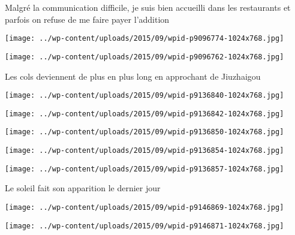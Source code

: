  \newline
 Malgré la communication difficile, je suis bien accueilli dans les restaurants et parfois on refuse de me faire payer l'addition \newline
 \newline
\centerline{\texttt{[image: ../wp-content/uploads/2015/09/wpid-p9096774-1024x768.jpg]} } 
 \newline
 \newline
\centerline{\texttt{[image: ../wp-content/uploads/2015/09/wpid-p9096762-1024x768.jpg]} } 
 \newline
 Les cols deviennent de plus en plus long en approchant de Jiuzhaigou \newline
 \newline
\centerline{\texttt{[image: ../wp-content/uploads/2015/09/wpid-p9136840-1024x768.jpg]} } 
 \newline
 \newline
\centerline{\texttt{[image: ../wp-content/uploads/2015/09/wpid-p9136842-1024x768.jpg]} } 
 \newline
 \newline
\centerline{\texttt{[image: ../wp-content/uploads/2015/09/wpid-p9136850-1024x768.jpg]} } 
 \newline
 \newline
\centerline{\texttt{[image: ../wp-content/uploads/2015/09/wpid-p9136854-1024x768.jpg]} } 
 \newline
 \newline
\centerline{\texttt{[image: ../wp-content/uploads/2015/09/wpid-p9136857-1024x768.jpg]} } 
 \newline
 Le soleil fait son apparition le dernier jour \newline
 \newline
\centerline{\texttt{[image: ../wp-content/uploads/2015/09/wpid-p9146869-1024x768.jpg]} } 
 \newline
 \newline
\centerline{\texttt{[image: ../wp-content/uploads/2015/09/wpid-p9146871-1024x768.jpg]} } 
 \newline

\newpage
 
